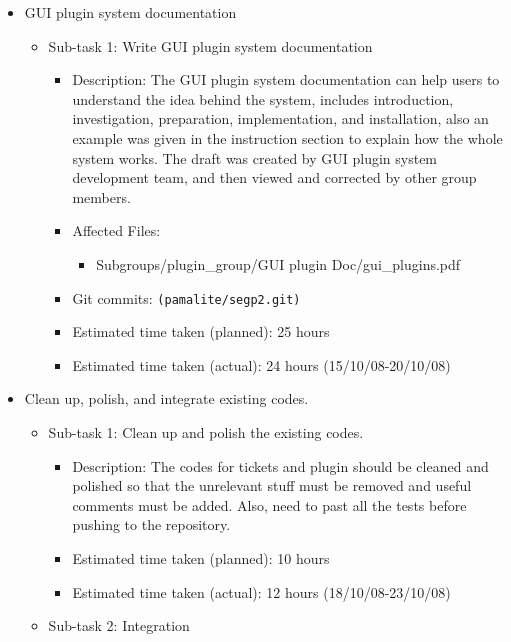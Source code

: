 \begin{itemize}
    \item GUI plugin system documentation
        \begin{itemize}
            \item Sub-task 1: Write GUI plugin system documentation
                \begin{itemize}
                    \item Description: The GUI plugin system documentation can help users to understand the idea behind the system, includes introduction, investigation, preparation, implementation, and installation, also an example was given in the instruction section to explain how the whole system works. The draft was created by GUI plugin system development team, and then viewed and corrected by other group members.
		     \item Affected Files:
                	\begin{itemize}
                    		\item Subgroups/plugin\_group/GUI plugin Doc/gui\_plugins.pdf
                	\end{itemize}
		    \item Git commits: \texttt{(pamalite/segp2.git)}
                    \item Estimated time taken (planned): 25 hours
                    \item Estimated time taken (actual):  24 hours (15/10/08-20/10/08)
                \end{itemize}
        \end{itemize}
    \item Clean up, polish, and integrate existing codes.
        \begin{itemize}
            \item Sub-task 1: Clean up and polish the existing codes.
                \begin{itemize}
                    \item Description: The codes for tickets and plugin should be cleaned and polished so that the unrelevant stuff must be removed and useful comments must be added. Also, need to past all the tests before pushing to the repository. 
                    \item Estimated time taken (planned): 10 hours
                    \item Estimated time taken (actual): 12 hours (18/10/08-23/10/08)
                \end{itemize}
            \item Sub-task 2: Integration

\end{itemize}
\end{itemize}
